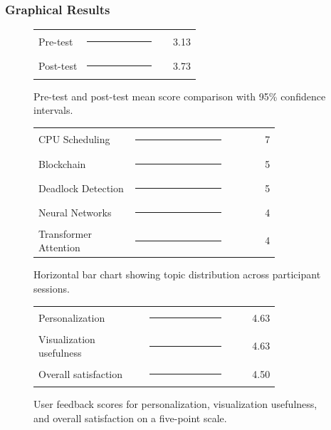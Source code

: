 \documentclass[conference]{IEEEtran}
\begin{document}
\subsubsection{Graphical Results}

\begin{figure}[htbp]
\centering
\scriptsize
\begin{tabular}{@{}p{0.30\linewidth}p{0.46\linewidth}r@{}}
Pre-test & \rule{0.86in}{5pt}\hspace{0.05in}{\scriptsize CI: 2.67--3.60} & 3.13 \\
Post-test & \rule{1.03in}{5pt}\hspace{0.05in}{\scriptsize CI: 3.59--3.87} & 3.73 \\
\end{tabular}
\caption{Pre-test and post-test mean score comparison with 95\% confidence intervals.}
\label{fig:pre-post-ci}
\end{figure}

\begin{figure}[htbp]
\centering
\scriptsize
\begin{tabular}{@{}p{0.40\linewidth}p{0.40\linewidth}r@{}}
CPU Scheduling & \rule{0.98in}{5pt} & 7 \\
Blockchain & \rule{0.70in}{5pt} & 5 \\
Deadlock Detection & \rule{0.70in}{5pt} & 5 \\
Neural Networks & \rule{0.56in}{5pt} & 4 \\
Transformer Attention & \rule{0.56in}{5pt} & 4 \\
\end{tabular}
\caption{Horizontal bar chart showing topic distribution across participant sessions.}
\label{fig:topic-distribution}
\end{figure}

\begin{figure}[htbp]
\centering
\scriptsize
\begin{tabular}{@{}p{0.46\linewidth}p{0.34\linewidth}r@{}}
Personalization & \rule{0.98in}{5pt} & 4.63 \\
Visualization usefulness & \rule{0.98in}{5pt} & 4.63 \\
Overall satisfaction & \rule{0.95in}{5pt} & 4.50 \\
\end{tabular}
\caption{User feedback scores for personalization, visualization usefulness, and overall satisfaction on a five-point scale.}
\label{fig:feedback-scores}
\end{figure}
\FloatBarrier
\end{document}

